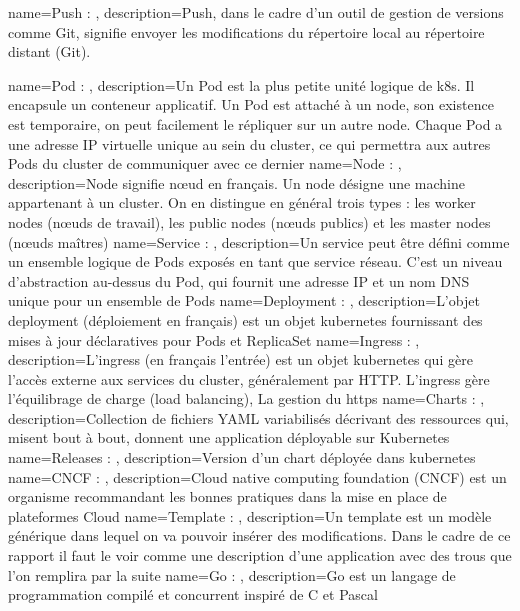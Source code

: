 {
    name=Push : ,
    description={Push, dans le cadre d'un outil de gestion de versions comme Git, signifie envoyer les modifications du répertoire local au répertoire distant (Git).}
}

{
    name=Pod : ,
    description={Un Pod est la plus petite unité logique de k8s. Il encapsule un conteneur applicatif. Un Pod est attaché à un node, son existence est temporaire, on peut facilement le répliquer sur un autre node. Chaque Pod a une adresse IP virtuelle unique au sein du cluster, ce qui permettra aux autres Pods du cluster de communiquer avec ce dernier}
}
{
    name=Node : ,
    description={Node signifie nœud en français. Un node désigne une machine appartenant à un cluster. On en distingue en général trois types : les worker nodes (nœuds de travail), les public nodes (nœuds publics) et les master nodes (nœuds maîtres)}
}
{
    name=Service : ,
    description={Un service peut être défini comme un ensemble logique de Pods exposés en tant que service réseau. C’est un niveau d’abstraction au-dessus du Pod, qui fournit une adresse IP et un nom DNS unique pour un ensemble de Pods}
}
{
    name=Deployment : ,
    description={L'objet deployment (déploiement en français) est un objet kubernetes fournissant des mises à jour déclaratives pour Pods et ReplicaSet}
}
{
    name=Ingress : ,
    description={L'ingress (en français l'entrée) est un objet kubernetes qui gère l'accès externe aux services du cluster, généralement par HTTP. L'ingress gère l'équilibrage de charge (load balancing), La gestion du https}
}
{
    name=Charts : ,
    description={Collection de fichiers YAML variabilisés décrivant des ressources qui, misent bout à bout, donnent une application déployable sur Kubernetes}
}
{
    name=Releases : ,
    description={Version d'un chart déployée dans kubernetes}
}
{
    name=CNCF : ,
    description={Cloud native computing foundation (CNCF) est un organisme recommandant les bonnes pratiques dans la mise en place de plateformes Cloud}
}
{
    name=Template : ,
    description={Un template est un modèle générique dans lequel on va pouvoir insérer des modifications. Dans le cadre de ce rapport il faut le voir comme une description d'une application avec des trous que l'on remplira par la suite}
}
{
    name=Go : ,
    description={Go est un langage de programmation compilé et concurrent inspiré de C et Pascal}
}
